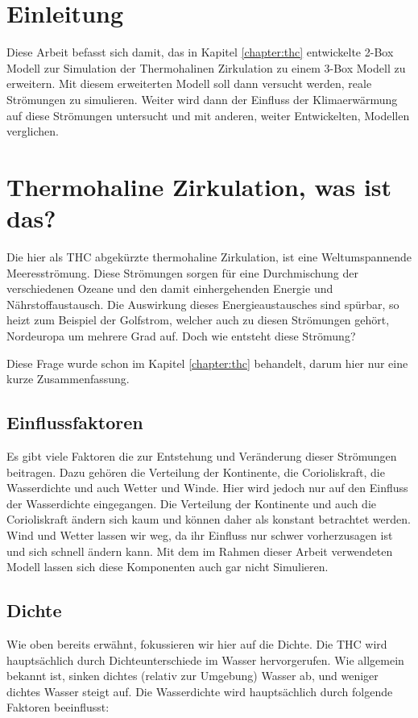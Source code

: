 \section{Einleitung}

Diese Arbeit befasst sich damit, das in Kapitel \ref{chapter:thc} entwickelte 2-Box Modell zur Simulation der Thermohalinen Zirkulation zu einem 3-Box Modell zu erweitern. Mit diesem erweiterten Modell soll dann versucht werden, reale Strömungen zu simulieren. Weiter wird dann der Einfluss der Klimaerwärmung auf diese Strömungen untersucht und mit anderen, weiter Entwickelten, Modellen verglichen.


\section{Thermohaline Zirkulation, was ist das?}

Die hier als THC abgekürzte thermohaline Zirkulation, ist eine Weltumspannende Meeresströmung.
Diese Strömungen sorgen für eine Durchmischung der verschiedenen Ozeane und den damit einhergehenden Energie und Nährstoffaustausch. 
Die Auswirkung dieses Energieaustausches sind spürbar, so heizt zum Beispiel der Golfstrom, welcher auch zu diesen Strömungen gehört, Nordeuropa um mehrere Grad auf.
Doch wie entsteht diese Strömung? 

Diese Frage wurde schon im Kapitel \ref{chapter:thc} behandelt, darum hier nur eine kurze Zusammenfassung. 



\subsection{Einflussfaktoren}
Es gibt viele Faktoren die zur Entstehung und Veränderung dieser Strömungen beitragen. Dazu gehören die Verteilung der Kontinente, die Corioliskraft, die Wasserdichte und auch Wetter und Winde. Hier wird jedoch nur auf den Einfluss der Wasserdichte eingegangen.
Die Verteilung der Kontinente und auch die Corioliskraft ändern sich kaum und können daher als konstant betrachtet werden. Wind und Wetter lassen wir weg, da ihr Einfluss nur schwer vorherzusagen ist und sich schnell ändern kann. Mit dem im Rahmen dieser Arbeit verwendeten Modell lassen sich diese Komponenten auch gar nicht Simulieren.

\subsection{Dichte}
Wie oben bereits erwähnt, fokussieren wir hier auf die Dichte.
Die THC wird hauptsächlich durch Dichteunterschiede im Wasser hervorgerufen.
Wie allgemein bekannt ist, sinken dichtes (relativ zur Umgebung) Wasser ab, und weniger dichtes Wasser steigt auf. Die Wasserdichte wird hauptsächlich durch folgende Faktoren beeinflusst:

